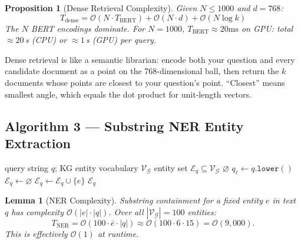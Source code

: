 \documentclass[12pt,a4paper]{article}
\theoremstyle{definition}
\theoremstyle{plain}
\newtheorem{lemma}[theorem]{Lemma}
\newtheorem{proposition}[theorem]{Proposition}
\theoremstyle{remark}
\begin{document}
\begin{proposition}[Dense Retrieval Complexity]
\label{prop:complexity}
Given $N \leq 1000$ and $d = 768$:
\[
  T_{\text{dense}} = \mathcal{O}(N \cdot T_{\text{BERT}})
  + \mathcal{O}(N \cdot d)
  + \mathcal{O}(N \log k)
\]
The $N$ BERT encodings dominate.  For $N=1000$, $T_{\text{BERT}}
\approx 20\text{ms}$ on GPU: total $\approx20$\,s (CPU) or
$\approx1$\,s (GPU) per query.
\end{proposition}

\begin{tcolorbox}[laymanbox]
Dense retrieval is like a semantic librarian: encode both your question
and every candidate document as a point on the 768-dimensional ball,
then return the $k$ documents whose points are closest to your
question's point. ``Closest'' means smallest angle, which equals the
dot product for unit-length vectors.
\end{tcolorbox}

\subsection{Algorithm 3 --- Substring NER Entity Extraction}

\begin{algorithm}[H]
\caption{\textsc{ExtractEntities}$(q)$ --- Substring NER against KG vocabulary}
\label{alg:ner}
\begin{algorithmic}[1]
\Require query string $q$; KG entity vocabulary $\mathcal{V}_{\mathcal{G}}$
\Ensure entity set $\mathcal{E}_q \subseteq \mathcal{V}_{\mathcal{G}}$
 \Return $\varnothing$ \EndIf
\State $q_\ell \gets q.\texttt{lower}()$
\State $\mathcal{E}_q \gets \varnothing$
    \State $\mathcal{E}_q \gets \mathcal{E}_q \cup \{e\}$
  \EndIf
\EndFor
\State \Return $\mathcal{E}_q$
\end{algorithmic}
\end{algorithm}

\begin{lemma}[NER Complexity]
\label{lem:ner}
Substring containment for a fixed entity $e$ in text $q$ has complexity
$\mathcal{O}(|e| \cdot |q|)$.  Over all $|\mathcal{V}_{\mathcal{G}}|
= 100$ entities:
\[
  T_{\text{NER}} = \mathcal{O}(100 \cdot \bar{e} \cdot |q|)
  \approx \mathcal{O}(100 \cdot 6 \cdot 15) = \mathcal{O}(9{,}000).
\]
This is effectively $\mathcal{O}(1)$ at runtime.
\end{lemma}
\end{document}

